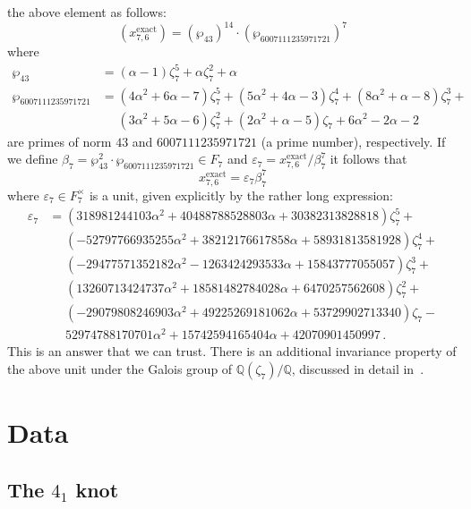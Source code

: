 \documentclass[12pt]{amsart}
\theoremstyle{definition}
\def\BQ{\mathbb Q}
\def\a{\alpha}
\begin{document}
the above element as follows:
$$
(x^{\mathrm{exact}}_{7,6})= (\wp_{43})^{14} \cdot (\wp_{6007111235971721})^7
$$
where 
\begin{align*}
\wp_{43} &= (\a - 1) \zeta_7^5 + \a \zeta_7^2 + \a \\
\wp_{6007111235971721} &= 
(4 \a^2 + 6 \a - 7) \zeta_7^5 + 
(5 \a^2 + 4 \a - 3) \zeta_7^4 + 
(8 \a^2 + \a - 8) \zeta_7^3 + \\ & \quad\,\,
(3 \a^2 + 5 \a - 6) \zeta_7^2 + 
(2 \a^2 + \a - 5) \zeta_7 + 6 \a^2 - 2 \a - 2
\end{align*}
are primes of norm $43$ and $6007111235971721$ (a prime number), 
respectively.
If we define $\beta_{7}=\wp_{43}^2 \cdot \wp_{6007111235971721} \in F_7$ and
$\varepsilon_{7}= x^{\mathrm{exact}}_{7,6}/\beta_{7}^7$
it follows that 
$$
x^{\mathrm{exact}}_{7,6} = \varepsilon_{7} \beta_{7}^7
$$
where $\varepsilon_{7} \in F_7^\times$ is a unit, given explicitly by the rather
long expression:
\begin{align*}
\varepsilon_{7} &=
 (318981244103 \a^2 + 40488788528803 \a + 30382313828818) \zeta_7^5 + 
\\ & \quad\,\,
(-52797766935255 \a^2 + 38212176617858 \a + 58931813581928) \zeta_7^4 + 
\\ & \quad\,\,
(-29477571352182 \a^2 - 1263424293533 \a + 15843777055057) \zeta_7^3 + 
\\ & \quad\,\,
(13260713424737 \a^2 + 18581482784028 \a + 6470257562608) \zeta_7^2 + 
\\ & \quad\,\,
(-29079808246903 \a^2 + 49225269181062 \a + 53729902713340) \zeta_7 - 
\\ & \quad\,\,
52974788170701 \a^2 + 15742594165404 \a + 42070901450997  \,.
\end{align*}
This is an answer that we can trust. There is an additional invariance
property of the above unit under the Galois group of $\BQ(\zeta_7)/\BQ$,
discussed in detail in~\cite{calegari}.


\section{Data}
\label{sec.data}

\subsection{The $4_1$ knot}
\label{sub.41}
\end{document}
